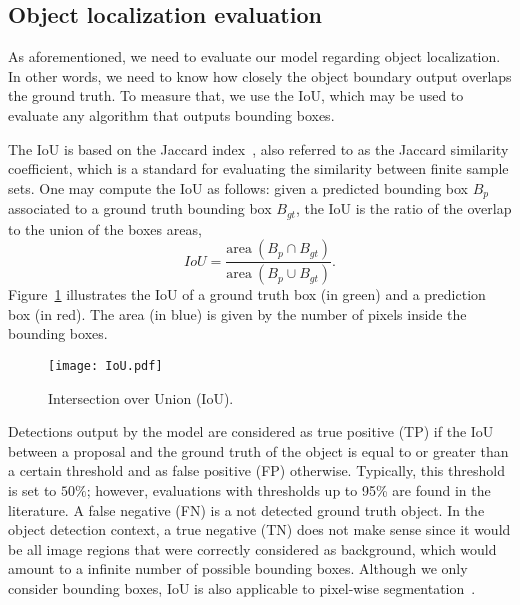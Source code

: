 \subsection{Object localization evaluation}
%
As aforementioned, we need to evaluate our model regarding object localization.
In other words, we need to know how closely the object boundary output overlaps the ground truth.
To measure that, we use the IoU,
which may be used to evaluate any algorithm that outputs bounding boxes.

The IoU is based on the Jaccard index~\cite{jaccard1912distribution}, also referred to as the Jaccard similarity coefficient, which is a standard for evaluating the similarity between finite sample sets.
One may compute the IoU as follows: given a predicted bounding box $B_{p}$ associated to a ground truth bounding box $B_{gt}$, the IoU is the ratio of the overlap to the union of the boxes areas,
%
\begin{equation}
 IoU = \frac{\textrm{area}~(B_p \cap B_{gt})}{\textrm{area}~(B_p \cup B_{gt})}
 \label{eq:IoU}.
\end{equation}
%
Figure~\ref{fig:IoU} illustrates the IoU of a ground truth box (in green) and a prediction box (in red).
The area (in blue) is given by the number of pixels inside the bounding boxes.
%
\begin{figure}[htb]
	\centering
	\texttt{[image: IoU.pdf]}
	\caption{Intersection over Union (IoU).}
	\label{fig:IoU}
\end{figure}

Detections output by the model are considered as true positive (TP) 
if the IoU between a proposal and the ground truth of the object is equal to or greater than a certain threshold and as false positive (FP) 
otherwise. Typically, this threshold is set to $50\%$; however, evaluations with thresholds up to 95\% are found in the literature.
A false negative (FN)  is a not detected ground truth object.
In the object detection context, a true negative (TN)  does not make sense since it would be all image regions that were
correctly considered as background, which would amount to a infinite number of possible bounding boxes.
Although we only consider bounding boxes, IoU is also applicable to pixel-wise segmentation~\cite{He2017mask}.

